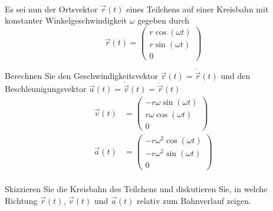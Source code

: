 \begin{enumeralph}
\begin{enumeroman}
\begin{align*}
			\end{align*}
		\end{enumeroman}
		\item Es sei nun der Ortsvektor $\overrightarrow{r}(t)$ eines Teilchens auf einer Kreisbahn mit konstanter Winkelgeschwindigkeit $\omega$ gegeben durch \[\overrightarrow{r}(t)=\begin{pmatrix}r\cos(\omega t)\\r\sin(\omega t)\\0\end{pmatrix}\]
		\begin{enumeroman}
			\item Berechnen Sie den Geschwindigkeitsvektor $\overrightarrow{v}(t)=\dot{\overrightarrow{r}}(t)$ und den Beschleunigungsvektor $\overrightarrow{a}(t)=\dot{\overrightarrow{v}}(t)=\ddot{\overrightarrow{r}}(t)$
			\begin{align*}
			\overrightarrow{v}(t)&=\begin{pmatrix}-r\omega\sin(\omega t)\\r\omega\cos(\omega t)\\0\end{pmatrix}\\
			\overrightarrow{a}(t)&=\begin{pmatrix}-r\omega^2\cos(\omega t)\\-r\omega^2\sin(\omega t)\\0\end{pmatrix}\\
			\end{align*}
			\item Skizzieren Sie die Kreisbahn des Teilchens und diskutieren Sie, in welche Richtung $\overrightarrow{r}(t)$, $\overrightarrow{v}(t)$ und $\overrightarrow{a}(t)$ relativ zum Bahnverlauf zeigen.\\
			\\

\end{enumeroman}
\end{enumeralph}
